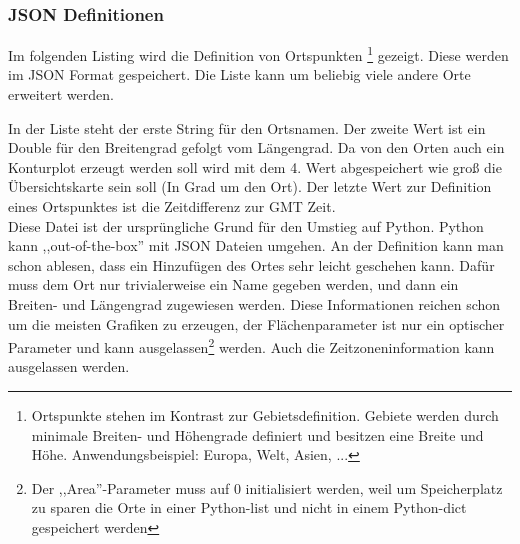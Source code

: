 \subsubsection*{JSON Definitionen}
Im folgenden Listing wird die Definition von Ortspunkten
\footnote{Ortspunkte stehen im Kontrast zur Gebietsdefinition. Gebiete werden durch minimale Breiten- und Höhengrade definiert und besitzen eine Breite und Höhe. Anwendungsbeispiel: Europa, Welt, Asien, ...} gezeigt.
Diese werden im JSON Format gespeichert.
Die Liste kann um beliebig viele andere Orte erweitert werden.

In der Liste steht der erste String für den Ortsnamen. Der zweite Wert ist ein Double für den Breitengrad gefolgt vom Längengrad.
Da von den Orten auch ein Konturplot erzeugt werden soll wird mit dem 4. Wert abgespeichert wie groß die Übersichtskarte sein soll (In Grad um den Ort).
Der letzte Wert zur Definition eines Ortspunktes ist die Zeitdifferenz zur GMT Zeit.\\
Diese Datei ist der ursprüngliche Grund für den Umstieg auf Python.
Python kann ,,out-of-the-box'' mit JSON Dateien umgehen. An der Definition kann man schon ablesen,
dass ein Hinzufügen des Ortes sehr leicht geschehen kann. Dafür muss dem Ort nur trivialerweise ein Name
gegeben werden, und dann ein Breiten- und Längengrad zugewiesen werden. Diese Informationen reichen
schon um die meisten Grafiken zu erzeugen, der Flächenparameter ist nur ein optischer Parameter und kann
ausgelassen\footnote{Der ,,Area''-Parameter muss auf 0 initialisiert werden,
weil um Speicherplatz zu sparen die Orte in einer
Python-list und nicht in einem Python-dict gespeichert werden} werden. Auch die Zeitzoneninformation kann
ausgelassen werden.

